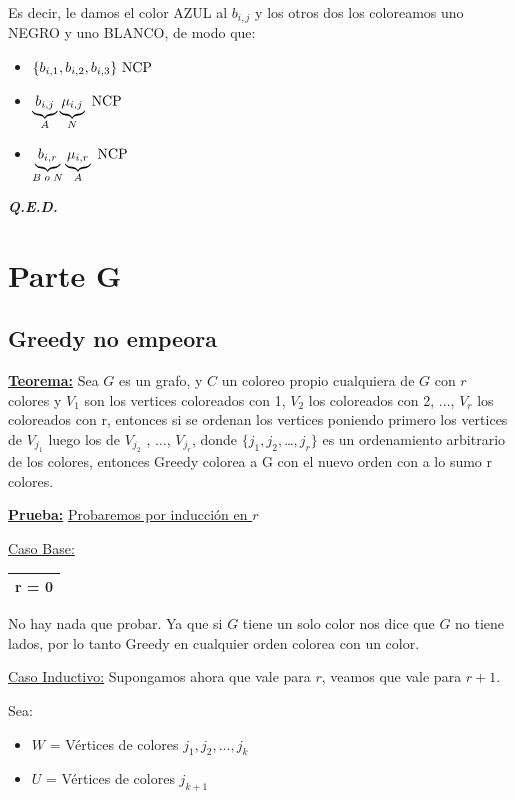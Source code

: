 \documentclass[12pt,a4paper]{report}
\newcommand{\QED}{\hfill \textit{\textbf{Q.E.D.}}}
\begin{document}
  				\par Es decir, le damos el color AZUL al $b_{i, j}$ y los otros dos los coloreamos uno NEGRO y uno BLANCO, de modo que:
  				\begin{itemize}
  					\item $\lbrace b_{i, 1}, b_{i, 2}, b_{i, 3} \rbrace \textup{ NCP}$
  			 		\item $\underbrace{b_{i, j}}_{A} \underbrace{\mu_{i, j}}_{N} \textup{ NCP}$
  			 		\item $\underbrace{b_{i, r}}_{B \; o \; N} \underbrace{\mu_{i, r}}_{A} \textup{ NCP}$
  				\end{itemize}

  		\QED


  \chapter{Parte G}

    \section{Greedy no empeora}
      \textbf{\underline{Teorema:}} Sea $G$ es un grafo, y $C$ un coloreo propio cualquiera de $G$ con $r$ colores y
        $V_1$ son los vertices coloreados con 1, $V_2$ los coloreados con 2, $\dots$, $V_r$ los coloreados con r,
        entonces si se ordenan los vertices poniendo primero
        los vertices de $V_{j_1}$
        luego los de $V_{j_2}$
        , $\dots$, $V_{j_r}$, donde $\{j_1, j_2, $\dots$, j_r\}$ es un ordenamiento arbitrario
        de los colores, entonces Greedy colorea a G con el nuevo orden con a lo sumo r colores.

      \textbf{\underline{Prueba:}} \underline{Probaremos por inducción en $r$}

        \vspace{3mm}
        \underline{Caso Base:} \begin{tabular}{|c|} \hline r = 0 \\\hline \end{tabular} No hay nada que probar. Ya que si
        $G$ tiene un solo color nos dice que $G$ no tiene lados, por lo tanto Greedy en cualquier orden colorea con un color.

        \vspace{3mm}
        \underline{Caso Inductivo:} Supongamos ahora que vale para $r$, veamos que vale para $r+1$.

        \vspace{3mm}
        Sea:
        \begin{itemize}
          \item $W$ = Vértices de colores $j_1, j_2, \dots, j_k$
          \item $U$ = Vértices de colores $j_{k+1}$
        \end{itemize}
\end{document}
